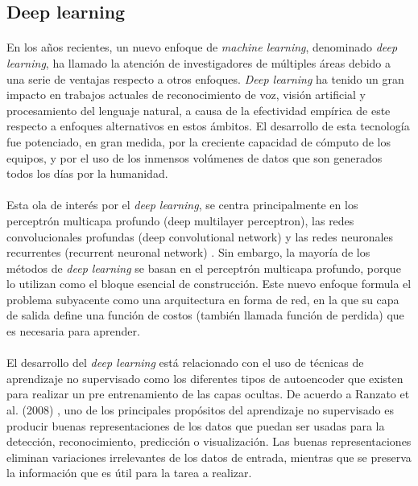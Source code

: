 \documentclass[12pt]{article}%
\begin{document}
\subsection{Deep learning}
\paragraph{}
En los años recientes, un nuevo enfoque de \textit{machine learning}, denominado \textit{deep learning}, ha llamado la atención de investigadores de múltiples áreas debido a una serie de ventajas respecto a otros enfoques. \textit{Deep learning} ha tenido un gran impacto en trabajos actuales de reconocimiento de voz, visión artificial y procesamiento del lenguaje natural, a causa de la efectividad empírica de este respecto a enfoques alternativos en estos ámbitos. El desarrollo de esta tecnología fue potenciado, en gran medida, por la creciente capacidad de cómputo de los equipos, y por el uso de los inmensos volúmenes de datos que son generados todos los días por la humanidad.

\paragraph{}
Esta ola de interés por el \textit{deep learning}, se centra principalmente en los perceptrón multicapa profundo (deep multilayer perceptron), las redes convolucionales profundas (deep convolutional network) y las redes neuronales recurrentes (recurrent neuronal network) \cite{mining}. Sin embargo, la mayoría de los métodos de \textit{deep learning} se basan en el perceptrón multicapa profundo, porque lo utilizan como el bloque esencial de construcción. Este nuevo enfoque formula el problema subyacente como una arquitectura en forma de red, en la que su capa de salida define una función de costos (también llamada función de perdida) que es necesaria para aprender.

\paragraph{}
El desarrollo del \textit{deep learning} está relacionado con el uso de técnicas de aprendizaje no supervisado como los diferentes tipos de autoencoder que existen para realizar un pre entrenamiento de las capas ocultas. De acuerdo a Ranzato et al. (2008) \cite{ranzato}, uno de los principales propósitos del aprendizaje no supervisado es producir buenas representaciones de los datos que puedan ser usadas para la detección, reconocimiento, predicción o visualización. Las buenas representaciones eliminan variaciones irrelevantes de los datos de entrada, mientras que se preserva la información que es útil para la tarea a realizar.
\end{document}

